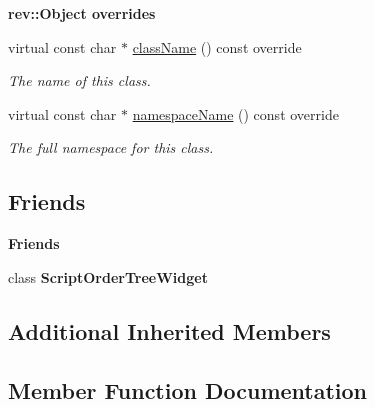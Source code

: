 \begin{Indent}\textbf{ rev\+::Object overrides}\par
\begin{DoxyCompactItemize}
\item 
virtual const char $\ast$ \mbox{\hyperlink{classrev_1_1_view_1_1_script_order_item_a80f36f0f815218dd2ea9ffb2b145d440}{class\+Name}} () const override
\begin{DoxyCompactList}\small\item\em The name of this class. \end{DoxyCompactList}\item 
virtual const char $\ast$ \mbox{\hyperlink{classrev_1_1_view_1_1_script_order_item_a1ac64a1d792c531644e8acea2385effd}{namespace\+Name}} () const override
\begin{DoxyCompactList}\small\item\em The full namespace for this class. \end{DoxyCompactList}\end{DoxyCompactItemize}
\end{Indent}
\subsection*{Friends}
\begin{Indent}\textbf{ Friends}\par
\begin{DoxyCompactItemize}
\item 
\mbox{\label{classrev_1_1_view_1_1_script_order_item_aba302cdd07f725585e444d5b1112f151}} 
class {\bfseries Script\+Order\+Tree\+Widget}
\end{DoxyCompactItemize}
\end{Indent}
\subsection*{Additional Inherited Members}


\subsection{Member Function Documentation}
\mbox{\label{classrev_1_1_view_1_1_script_order_item_a80f36f0f815218dd2ea9ffb2b145d440}} 

